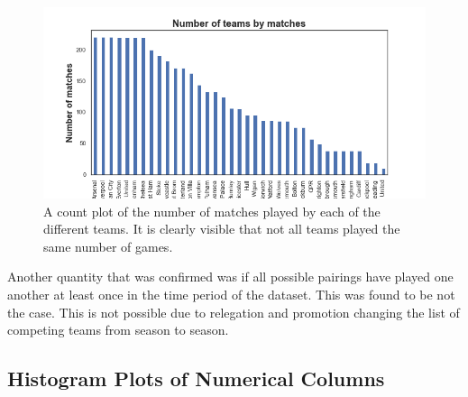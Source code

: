 \documentclass[a4paper,12pt]{article}
\begin{document}
	\begin{figure}[H]
		\renewcommand\thefigure{2.1}
		\centering
		
		\includegraphics[scale=0.6]{num_of_matches.png}
		\caption{A count plot of the number of matches played by each of the different teams. It is clearly visible that not all teams played the same number of games.}
	\end{figure}
	
	Another quantity that was confirmed was if all possible pairings have played one another at least once in the time period of the dataset. This was found to be not the case. This is not possible due to relegation and promotion changing the list of competing teams from season to season.  
	
	\subsection{Histogram Plots of Numerical Columns}
	
\end{document}
